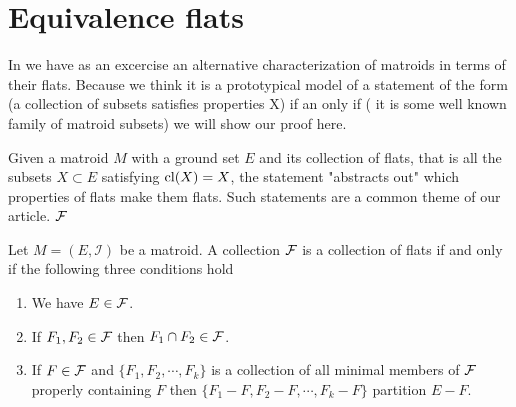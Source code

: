 \section{Equivalence flats}

In \cite[35]{oxley1} we have as an excercise an alternative characterization of matroids in terms of their flats. Because we think it is a prototypical model of a statement of the form (a collection of subsets satisfies properties X) if an only if ( it is some well known family of matroid subsets) we will show our proof here.

Given a matroid $M$ with a ground set $E$ and its collection of flats, that is all the subsets $X \subset E$ satisfying $\mathrm{cl}(X) = X$, the statement "abstracts out" which properties of flats make them flats. Such statements are a common theme of our article.
$\mathcal{F}$
\begin{theorem}
    Let $M = (E, \mathcal{I})$ be a matroid. A collection $\mathcal{F}$ is a collection of flats if and only if the following three conditions hold

    \begin{enumerate}
        \item We have $E \in \mathcal{F}$.
        \item If $F_1, F_2 \in \mathcal{F}$ then $F_1 \cap F_2 \in \mathcal{F}$.
        \item If $F \in \mathcal{F}$ and $\{F_1, F_2, \cdots, F_k\}$ is a collection of all minimal members of $\mathcal{F}$ properly containing $F$ then $\{F_1-F, F_2-F, \cdots, F_k - F\}$ partition $E-F$.
        
    \end{enumerate}
        
\end{theorem}


